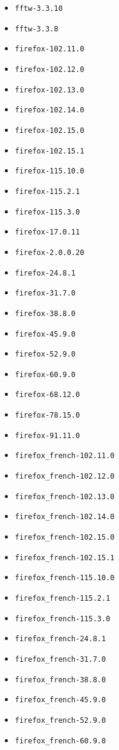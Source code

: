 \begin{multicols}{3}
\begin{itemize}
\item \verb|fftw-3.3.10|
\item \verb|fftw-3.3.8|
\item \verb|firefox-102.11.0|
\item \verb|firefox-102.12.0|
\item \verb|firefox-102.13.0|
\item \verb|firefox-102.14.0|
\item \verb|firefox-102.15.0|
\item \verb|firefox-102.15.1|
\item \verb|firefox-115.10.0|
\item \verb|firefox-115.2.1|
\item \verb|firefox-115.3.0|
\item \verb|firefox-17.0.11|
\item \verb|firefox-2.0.0.20|
\item \verb|firefox-24.8.1|
\item \verb|firefox-31.7.0|
\item \verb|firefox-38.8.0|
\item \verb|firefox-45.9.0|
\item \verb|firefox-52.9.0|
\item \verb|firefox-60.9.0|
\item \verb|firefox-68.12.0|
\item \verb|firefox-78.15.0|
\item \verb|firefox-91.11.0|
\item \verb|firefox_french-102.11.0|
\item \verb|firefox_french-102.12.0|
\item \verb|firefox_french-102.13.0|
\item \verb|firefox_french-102.14.0|
\item \verb|firefox_french-102.15.0|
\item \verb|firefox_french-102.15.1|
\item \verb|firefox_french-115.10.0|
\item \verb|firefox_french-115.2.1|
\item \verb|firefox_french-115.3.0|
\item \verb|firefox_french-24.8.1|
\item \verb|firefox_french-31.7.0|
\item \verb|firefox_french-38.8.0|
\item \verb|firefox_french-45.9.0|
\item \verb|firefox_french-52.9.0|
\item \verb|firefox_french-60.9.0|

\end{itemize}
\end{multicols}
